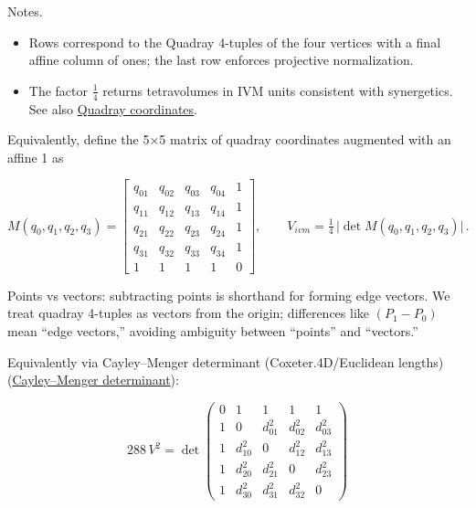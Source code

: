 \documentclass[
  10pt,
]{article}
\providecommand{\tightlist}{%
  \setlength{\itemsep}{0pt}\setlength{\parskip}{0pt}}
\begin{document}
Notes.

\begin{itemize}
\tightlist
\item
  Rows correspond to the Quadray 4-tuples of the four vertices with a
  final affine column of ones; the last row enforces projective
  normalization.
\item
  The factor \(\tfrac{1}{4}\) returns tetravolumes in IVM units
  consistent with synergetics. See also
  \href{https://en.wikipedia.org/wiki/Quadray_coordinates}{Quadray
  coordinates}.
\end{itemize}

Equivalently, define the 5×5 matrix of quadray coordinates augmented
with an affine 1 as

\begin{equation}\label{eq:ace5x5_expanded}
M(q_0,q_1,q_2,q_3) = \begin{bmatrix}
q_{01} & q_{02} & q_{03} & q_{04} & 1 \\
q_{11} & q_{12} & q_{13} & q_{14} & 1 \\
q_{21} & q_{22} & q_{23} & q_{24} & 1 \\
q_{31} & q_{32} & q_{33} & q_{34} & 1 \\
1 & 1 & 1 & 1 & 0
\end{bmatrix},\qquad V_{ivm} = \tfrac{1}{4}\,\big|\det M(q_0,q_1,q_2,q_3)\big|\,.
\end{equation}

Points vs vectors: subtracting points is shorthand for forming edge
vectors. We treat quadray 4-tuples as vectors from the origin;
differences like \((P_1-P_0)\) mean ``edge vectors,'' avoiding ambiguity
between ``points'' and ``vectors.''

Equivalently via Cayley--Menger determinant (Coxeter.4D/Euclidean
lengths)
(\href{https://en.wikipedia.org/wiki/Cayley\%E2\%80\%93Menger_determinant}{Cayley--Menger
determinant}):

\begin{equation}\label{eq:cayley_menger}
288\,V^2 = \det\begin{pmatrix}
  0 & 1 & 1 & 1 & 1 \\
  1 & 0 & d_{01}^2 & d_{02}^2 & d_{03}^2 \\
  1 & d_{10}^2 & 0 & d_{12}^2 & d_{13}^2 \\
  1 & d_{20}^2 & d_{21}^2 & 0 & d_{23}^2 \\
  1 & d_{30}^2 & d_{31}^2 & d_{32}^2 & 0
\end{pmatrix}
\end{equation}
\end{document}
